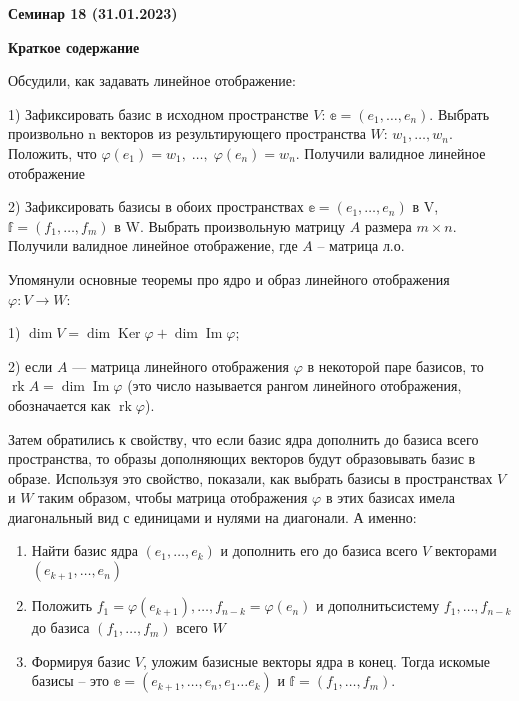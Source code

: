 \documentclass[10pt, a4paper]{extarticle}
\newcommand{\rk}{\operatorname{\mathrm{rk}}}
\newcommand{\Ker}{\mathop{\mathrm{Ker}}}
\renewcommand{\Im}{\mathop{\mathrm{Im}}}
\theoremstyle{definition}
\begin{document}
\begin{center}
\small
\noindent{}
\end{center}

\large

\begin{center}
\textbf{Семинар 18 (31.01.2023)}
\end{center}

\textbf{Краткое содержание}

Обсудили, как задавать линейное отображение:

1) Зафиксировать базис в исходном пространстве $V$: $\mathbb{e} = (e_1, \dots, e_n)$. Выбрать произвольно n векторов из результирующего пространства $W$:
$w_1, \dots, w_n$. Положить, что $\varphi(e_1) = w_1, \; \dots, \; \varphi(e_n) = w_n$. Получили валидное линейное отображение

2) Зафиксировать базисы в обоих пространствах $\mathbb{e} = (e_1, \dots, e_n)$ в V, $\mathbb{f} = (f_1, \dots, f_m)$ в W. Выбрать произвольную матрицу $A$ размера $m \times n$. 
Получили валидное линейное отображение, где $A$ -- матрица л.о.

Упомянули основные теоремы про ядро и образ линейного отображения $\varphi \colon V \to W$:

1) $\dim V = \dim \Ker \varphi + \dim \Im \varphi$;

2) если $A$ --- матрица линейного отображения $\varphi$ в некоторой паре базисов, то $\rk A = \dim \Im \varphi$ (это число называется рангом линейного отображения, обозначается как $\rk \varphi$).

Затем обратились к свойству, что если базис ядра дополнить до базиса всего пространства, то образы дополняющих векторов будут образовывать базис в образе.
Используя это свойство, показали, как выбрать базисы в пространствах $V$ и $W$ таким образом, чтобы матрица отображения $\varphi$ в этих базисах имела диагональный вид с единицами и нулями на диагонали.
А именно:
\begin{enumerate}
    \item Найти базис ядра $(e_1,\dots,e_k)$ и дополнить его до базиса всего $V$ векторами $(e_{k+1},\dots,e_n)$
    \item Положить $f_1 = \varphi(e_{k+1}),\dots, f_{n-k} = \varphi(e_n)$ и дополнитьсистему $f_1,\dots,f_{n-k}$ до базиса $(f_1,\dots, f_m)$ всего $W$
    \item Формируя базис $V$, уложим базисные векторы ядра в конец. Тогда искомые базисы -- это $\mathbb e = (e_{k+1},\dots, e_n, e_1 \dots e_k)$ и $\mathbb f = (f_1,\dots, f_m)$. 
\end{enumerate}
\end{document}
